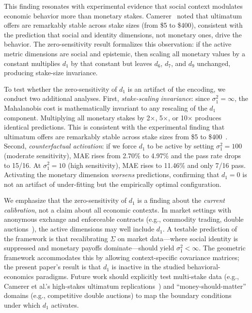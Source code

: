 \documentclass[journal]{IEEEtran}
\begin{document}
This finding resonates with experimental evidence that social context modulates economic behavior more than monetary stakes.
Camerer~\cite{camerer2003} noted that ultimatum offers are remarkably stable across stake sizes (from \$5 to \$400), consistent with the prediction that social and identity dimensions, not monetary ones, drive the behavior.
The zero-sensitivity result formalizes this observation: if the active metric dimensions are social and epistemic, then scaling all monetary values by a constant multiplies $d_1$ by that constant but leaves $d_6$, $d_7$, and $d_9$ unchanged, producing stake-size invariance.

To test whether the zero-sensitivity of $d_1$ is an artifact of the encoding, we conduct two additional analyses.
First, \emph{stake-scaling invariance}: since $\sigma_1^2 = \infty$, the Mahalanobis cost is mathematically invariant to any rescaling of the $d_1$ component.
Multiplying all monetary stakes by 2$\times$, 5$\times$, or 10$\times$ produces identical predictions.
This is consistent with the experimental finding that ultimatum offers are remarkably stable across stake sizes from \$5 to \$400~\cite{camerer2003}.
Second, \emph{counterfactual activation}: if we force $d_1$ to be active by setting $\sigma_1^2 = 100$ (moderate sensitivity), MAE rises from 2.70\% to 4.97\% and the pass rate drops to 15/16.
At $\sigma_1^2 = 10$ (high sensitivity), MAE rises to 11.46\% and only 7/16 pass.
Activating the monetary dimension \emph{worsens} predictions, confirming that $d_1 = 0$ is not an artifact of under-fitting but the empirically optimal configuration.

We emphasize that the zero-sensitivity of $d_1$ is a finding about the \emph{current calibration}, not a claim about all economic contexts.
In market settings with anonymous exchange and enforceable contracts (e.g., commodity trading, double auctions~\cite{smith1962}), the active dimensions may well include $d_1$.
A testable prediction of the framework is that recalibrating $\Sigma$ on market data---where social identity is suppressed and monetary payoffs dominate---should yield $\sigma_1^2 < \infty$.
The geometric framework accommodates this by allowing context-specific covariance matrices; the present paper's result is that $d_1$ is inactive in the studied behavioral-economics paradigms.
Future work should explicitly test multi-stake data (e.g., Camerer et al.'s high-stakes ultimatum replications~\cite{camerer2003}) and ``money-should-matter'' domains (e.g., competitive double auctions) to map the boundary conditions under which $d_1$ activates.
\end{document}
